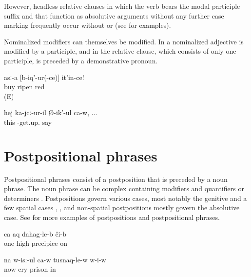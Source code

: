 However, headless relative clauses in which the verb bears the modal participle suffix  and that function as absolutive arguments without any further case marking frequently occur without  or  (see  for examples).

Nominalized modifiers can themselves be modified. In  a nominalized adjective is modified by a participle, and in  the relative clause, which consists of only one participle, is preceded by a demonstrative pronoun.


\begin{exe}
	\ex	\label{ex:Buy a ripe red one minor2}
	\gll	asː-a	[b-iq'-ur(-ce)]	it'in-ce!\\
		buy	ripen	red\\
	\glt	{} (E)
	
		\ex	\label{ex:The one who is standing says2}
	\gll	hej	ka-jcː-ur-il	Ø-ik'-ul	ca-w, ...\\
		this	-get.up.	say	 \\
	\glt	{}
	
	
\end{exe}




\section{Postpositional phrases}
\label{sec:Postpositional phrases}

Postpositional phrases consist of a postposition that is preceded by a noun phrase. The noun phrase can be complex containing modifiers and quantifiers or determiners . Postpositions govern various cases, most notably the genitive and a few spatial cases , , and non-spatial postpositions mostly govern the absolutive case. See  for more examples of postpositions and postpositional phrases.
%
\begin{exe}
	\ex	\label{ex:on one high precipice}
	\gll	ca	aq	dahag-le-b či-b\\
		one	high	precipice on\\
	\glt	{}

	\ex	\label{ex:‎Now he is crying in prison}
	\gll	na	w-isː-ul	ca-w	tusnaq-le-w	w-i-w\\
		now	cry		prison	in\\
	\glt	{}
\end{exe}

